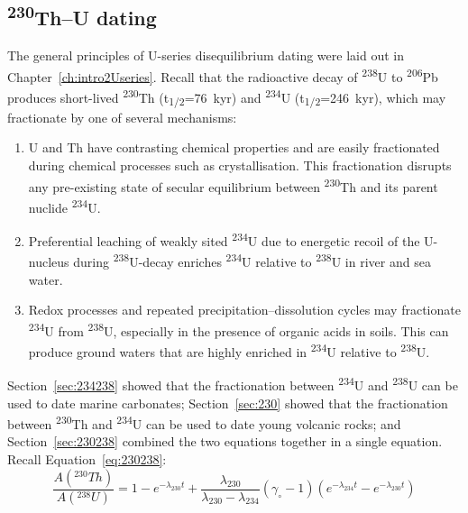 \begin{refsection}

\chapter{\textsuperscript{230}Th--U dating}\label{ch:ThU}

The general principles of U-series disequilibrium dating were laid out
in Chapter~\ref{ch:intro2Useries}. Recall that the radioactive decay
of \textsuperscript{238}U to \textsuperscript{206}Pb produces
short-lived \textsuperscript{230}Th (t\textsubscript{1/2}=76~kyr) and
\textsuperscript{234}U (t\textsubscript{1/2}=246~kyr), which may
fractionate by one of several mechanisms:

\begin{enumerate}
\item U and Th have contrasting chemical properties and are easily
  fractionated during chemical processes such as crystallisation. This
  fractionation disrupts any pre-existing state of secular equilibrium
  between \textsuperscript{230}Th and its parent nuclide
  \textsuperscript{234}U.
\item Preferential leaching of weakly sited \textsuperscript{234}U due
  to energetic recoil of the U-nucleus during
  \textsuperscript{238}U-decay enriches \textsuperscript{234}U
  relative to \textsuperscript{238}U in river and sea water.
\item Redox processes and repeated precipitation--dissolution cycles
  may fractionate \textsuperscript{234}U from \textsuperscript{238}U,
  especially in the presence of organic acids in soils. This can
  produce ground waters that are highly enriched in
  \textsuperscript{234}U relative to \textsuperscript{238}U.
\end{enumerate}

Section~\ref{sec:234238} showed that the fractionation between
\textsuperscript{234}U and \textsuperscript{238}U can be used to date
marine carbonates; Section~\ref{sec:230} showed that the fractionation
between \textsuperscript{230}Th and \textsuperscript{234}U can be used
to date young volcanic rocks; and Section~\ref{sec:230238} combined
the two equations together in a single equation. Recall
Equation~\ref{eq:230238}:
\begin{equation}
  \frac{A(^{230}Th)}{A(^{238}U)} = 1 - e^{-\lambda_{230}t} +
  \frac{\lambda_{230}}{\lambda_{230}-\lambda_{234}} (\gamma_\circ-1)
\left(e^{-\lambda_{234}t}-e^{-\lambda_{230}t}\right)
\end{equation}


\end{refsection}
